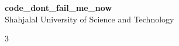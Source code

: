 \documentclass[9pt, a4paper]{extreport}
\begin{document}
\begin{center}
  {\huge \bfseries code\_dont\_fail\_me\_now}\\[0.3em]
  {\large Shahjalal University of Science and Technology}\\[0.2em]
\end{center}

\begin{multicols*}{3}
  \tableofcontents
  \vspace*{10pt}

  

\end{multicols*}
\end{document}
